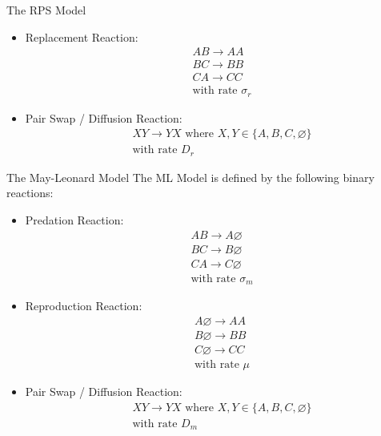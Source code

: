 \documentclass{beamer}
\begin{document}
\begin{frame}{}
\begin{textblock}{0.32}
\begin{block}{The RPS Model}
\begin{itemize}
            \item Replacement Reaction:
            \begin{align*}
                &AB \rightarrow AA\\
                &BC \rightarrow BB\\
                &CA \rightarrow CC\\            
                &\text{with rate } \sigma_r
            \end{align*}
            \item Pair Swap / Diffusion Reaction:
            \begin{align*}
                &XY \rightarrow YX \text{ where } X, Y \in \{A, B, C, \varnothing\}\\
                &\text{with rate } D_r
            \end{align*}
        \end{itemize}
    \end{block}
    \begin{block}{The May-Leonard Model}
        The ML Model is defined by the following binary reactions:
        \begin{itemize}
            \item Predation Reaction:
            \begin{align*}
                &AB \rightarrow A \varnothing \\
                &BC \rightarrow B \varnothing \\
                &CA \rightarrow C \varnothing \\            
                &\text{with rate } \sigma_m
            \end{align*}
            \item Reproduction Reaction:
            \begin{align*}
                &A \varnothing \rightarrow AA\\
                &B \varnothing \rightarrow BB\\
                &C \varnothing \rightarrow CC\\            
                &\text{with rate } \mu
            \end{align*}
            \item Pair Swap / Diffusion Reaction:
            \begin{align*}
                &XY \rightarrow YX \text{ where } X, Y \in \{A, B, C, \varnothing\}\\
                &\text{with rate } D_m
            \end{align*}
        \end{itemize}


\end{block}
\end{textblock}
\end{frame}
\end{document}
